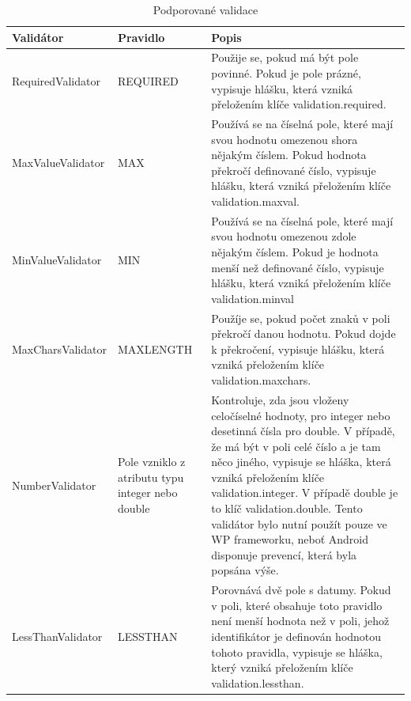 \begin{table}[h!]
\begin{center}
\caption{Podporované validace}
\label{table:F}
\begin{tabular}{|p{3.5cm}|p{4.5cm}|p{7cm}|}
\hline
\textbf{Validátor} & \textbf{Pravidlo} & \textbf{Popis} \\
\hline
RequiredValidator & 
REQUIRED & Použije se, pokud má být pole povinné. Pokud je pole prázné, vypisuje hlášku, která vzniká přeložením klíče validation.required. \\
\hline
MaxValueValidator &
MAX & Používá se na číselná pole, které mají svou hodnotu omezenou shora nějakým číslem. Pokud hodnota překročí definované číslo, vypisuje hlášku, která vzniká přeložením klíče validation.maxval. \\
\hline
MinValueValidator & MIN &
Používá se na číselná pole, které mají svou hodnotu omezenou zdole nějakým číslem. Pokud je hodnota menší než definované číslo, vypisuje hlášku, která vzniká přeložením klíče validation.minval \\
\hline
MaxCharsValidator & MAXLENGTH &
Použíje se, pokud počet znaků v poli překročí danou hodnotu. Pokud dojde k překročení, vypisuje hlášku, která vzniká přeložením klíče validation.maxchars.\\
\hline
NumberValidator & Pole vzniklo z atributu typu integer nebo double &
Kontroluje, zda jsou vloženy celočíselné hodnoty, pro integer nebo desetinná čísla pro double. V případě, že má být v poli celé číslo a je tam něco jiného, vypisuje se hláška, která vzniká přeložením klíče validation.integer. V případě double je to klíč validation.double. 
Tento validátor bylo nutní použít pouze ve WP frameworku, neboť Android disponuje prevencí, která byla popsána výše.\\
\hline
LessThanValidator & LESSTHAN &
Porovnává dvě pole s datumy. Pokud v poli, které obsahuje toto pravidlo není menší hodnota než v poli, jehož identifikátor je definován hodnotou tohoto pravidla, vypisuje se hláška, který vzniká přeložením klíče validation.lessthan.  \\
\hline
\end{tabular}
\end{center}
\end{table}


